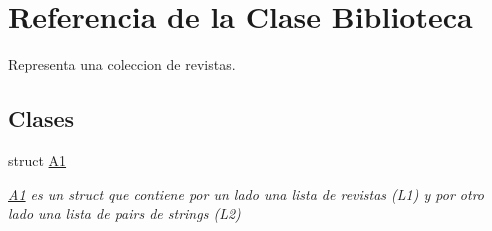 \hypertarget{class_biblioteca}{\section{Referencia de la Clase Biblioteca}
\label{class_biblioteca}
}


Representa una coleccion de revistas.  


\subsection*{Clases}
\begin{DoxyCompactItemize}
\item 
struct \hyperlink{struct_biblioteca_1_1_a1}{A1}
\begin{DoxyCompactList}\small\item\em \hyperlink{struct_biblioteca_1_1_a1}{A1} es un struct que contiene por un lado una lista de revistas (L1) y por otro lado una lista de pairs de strings (L2) \end{DoxyCompactList}\end{DoxyCompactItemize}
